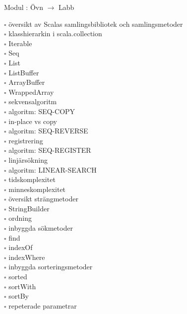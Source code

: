 
    Modul : Övn  $\rightarrow$ Labb 
    \begin{multicols}{3}\SlideFontTiny
    $\square$ översikt av Scalas samlingsbibliotek och samlingsmetoder \\
$\square$ klasshierarkin i scala.collection \\
$\square$ Iterable \\
$\square$ Seq \\
$\square$ List \\
$\square$ ListBuffer \\
$\square$ ArrayBuffer \\
$\square$ WrappedArray \\
$\square$ sekvensalgoritm \\
$\square$ algoritm: SEQ-COPY \\
$\square$ in-place vs copy \\
$\square$ algoritm: SEQ-REVERSE \\
$\square$ registrering \\
$\square$ algoritm: SEQ-REGISTER \\
$\square$ linjärsökning \\
$\square$ algoritm: LINEAR-SEARCH \\
$\square$ tidskomplexitet \\
$\square$ minneskomplexitet \\
$\square$ översikt strängmetoder \\
$\square$ StringBuilder \\
$\square$ ordning \\
$\square$ inbyggda sökmetoder \\
$\square$ find \\
$\square$ indexOf \\
$\square$ indexWhere \\
$\square$ inbyggda sorteringsmetoder \\
$\square$ sorted \\
$\square$ sortWith \\
$\square$ sortBy \\
$\square$ repeterade parametrar \\
    \end{multicols}
    